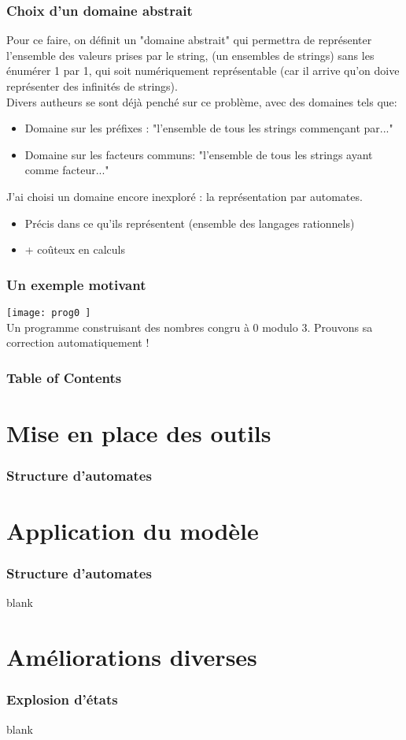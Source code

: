 \documentclass{beamer}
\begin{document}
\begin{frame}
  \frametitle{Choix d'un domaine abstrait}
  Pour ce faire, on définit un "domaine abstrait" qui permettra de
  représenter l'ensemble des valeurs prises par le string, (un
  ensembles de strings) sans les énumérer 1 par 1, qui soit numériquement représentable
  (car il arrive qu'on doive représenter des infinités de strings). \\
  
  Divers autheurs se sont déjà penché sur ce problème, avec des domaines tels que:
  \begin{itemize}
    \item Domaine sur les préfixes : "l'ensemble de tous les strings commençant par..."
    \item Domaine sur les facteurs communs: "l'ensemble de tous les strings ayant comme facteur..."
  \end{itemize}
  
  J'ai choisi un domaine encore inexploré : la représentation par automates.
  \begin{itemize}
    \item[\textcolor{green}{\textbullet}] Précis dans ce qu'ils représentent (ensemble des langages rationnels)
    \item[\textcolor{red}{\textbullet}] + coûteux en calculs
  \end{itemize}
\end{frame}

\begin{frame}
  \frametitle{Un exemple motivant}
  \texttt{[image:  prog0 ]} \\ %
  Un programme construisant des nombres congru à 0 modulo 3. Prouvons sa correction automatiquement !
\end{frame}

\begin{frame}
  \frametitle{Table of Contents}
  \tableofcontents
\end{frame}

\section{Mise en place des outils}

\begin{frame}
  \frametitle{Structure d'automates}
  
\end{frame}


\section{Application du modèle}


\begin{frame}
  \frametitle{Structure d'automates}
  blank
\end{frame}

\section{Améliorations diverses}

\begin{frame}
  \frametitle{Explosion d'états} %
  blank
\end{frame}
\end{document}
